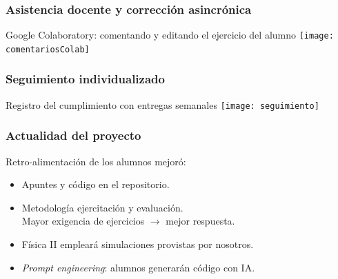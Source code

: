 \documentclass[aspectratio=43]{beamer}
\begin{document}
\begin{frame}
	\frametitle{Asistencia docente y corrección asincrónica}
	\begin{block}{Google Colaboratory: comentando y editando el ejercicio del alumno}
		\texttt{[image: comentariosColab]}
	\end{block}
\end{frame}


\begin{frame}
	\frametitle{Seguimiento individualizado}
	\begin{block}{Registro del cumplimiento con entregas semanales}
		\texttt{[image: seguimiento]}
	\end{block}
\end{frame}




\begin{frame}
	\frametitle{Actualidad del proyecto}
	\pause
	\begin{block}{}
		\begin{description}[<+->]
			\item [2023] Retro-alimentación de los alumnos mejoró:
				\begin{itemize}
					\item Apuntes y código en el repositorio.
					\item Metodología ejercitación y evaluación.\\
							Mayor exigencia de ejercicios \(\rightarrow\) mejor respuesta.
				\end{itemize}
			\item [2024] 
				\begin{itemize}
					\item Física II empleará simulaciones provistas por nosotros.
					\item \emph{Prompt engineering}: alumnos generarán código con IA.
				\end{itemize}
		\end{description}
	\end{block}
\end{frame}
\end{document}
